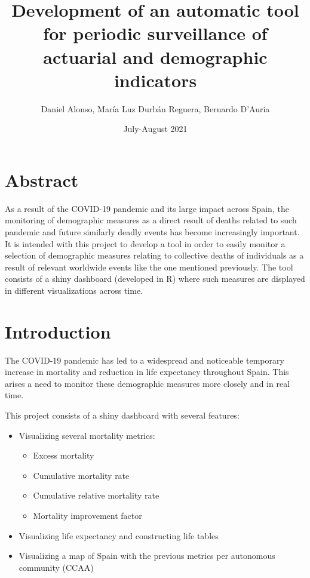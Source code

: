 \documentclass[]{article}
\title{Development of an automatic tool for periodic surveillance of actuarial
and demographic indicators}
\author{Daniel Alonso, María Luz Durbán Reguera, Bernardo D'Auria}
\date{July-August 2021}
\providecommand{\tightlist}{%
  \setlength{\itemsep}{0pt}\setlength{\parskip}{0pt}}
\begin{document}
\maketitle

{
\setcounter{tocdepth}{2}
\tableofcontents
}
\newpage

\hypertarget{abstract}{%
\section{Abstract}\label{abstract}}

As a result of the COVID-19 pandemic and its large impact across Spain,
the monitoring of demographic measures as a direct result of deaths
related to such pandemic and future similarly deadly events has become
increasingly important. It is intended with this project to develop a
tool in order to easily monitor a selection of demographic measures
relating to collective deaths of individuals as a result of relevant
worldwide events like the one mentioned previously. The tool consists of
a shiny dashboard (developed in R) where such measures are displayed in
different visualizations across time.

\hypertarget{introduction}{%
\section{Introduction}\label{introduction}}

The COVID-19 pandemic has led to a widespread and noticeable temporary
increase in mortality and reduction in life expectancy throughout Spain.
This arises a need to monitor these demographic measures more closely
and in real time.

This project consists of a shiny dashboard with several features:

\begin{itemize}
\item
  Visualizing several mortality metrics:

  \begin{itemize}
  \tightlist
  \item
    Excess mortality
  \item
    Cumulative mortality rate
  \item
    Cumulative relative mortality rate
  \item
    Mortality improvement factor
  \end{itemize}
\item
  Visualizing life expectancy and constructing life tables
\item
  Visualizing a map of Spain with the previous metrics per autonomous
  community (CCAA)
\end{itemize}
\end{document}
